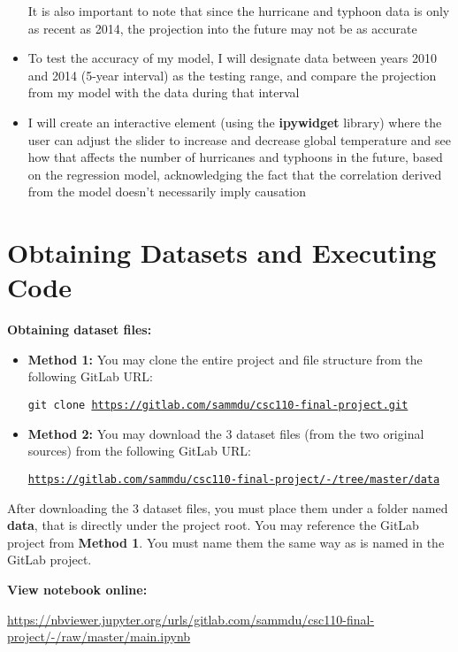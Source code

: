 \documentclass[fontsize=11pt]{article}
\begin{document}
\begin{itemize}
    It is also important to note that since the hurricane and typhoon data is only as recent as 2014, the projection into the future may not be as accurate

    \item To test the accuracy of my model, I will designate data between years 2010 and 2014 (5-year interval) as the testing range, and compare the projection from my model with the data during that interval

    \item I will create an interactive element (using the \textbf{ipywidget} library) where the user can adjust the slider to increase and decrease global temperature and see how that affects the number of hurricanes and typhoons in the future, based on the regression model, acknowledging the fact that the correlation derived from the model doesn't necessarily imply causation
\end{itemize}

\section*{Obtaining Datasets and Executing Code}

\textbf{Obtaining dataset files:}

\begin{itemize}
    \item \textbf{Method 1:} You may clone the entire project and file structure from the following GitLab URL:

    \qquad \texttt{git clone \url{https://gitlab.com/sammdu/csc110-final-project.git}}

    \item \textbf{Method 2:} You may download the 3 dataset files (from the two original sources) from the following GitLab URL:

    \qquad \texttt{\url{https://gitlab.com/sammdu/csc110-final-project/-/tree/master/data}}
\end{itemize}

After downloading the 3 dataset files, you must place them under a folder named \textbf{data}, that is directly under the project root. You may reference the GitLab project from \textbf{Method 1}. You must name them the same way as is named in the GitLab project.

\bigskip

\noindent \textbf{View notebook online:}

\medskip

\url{https://nbviewer.jupyter.org/urls/gitlab.com/sammdu/csc110-final-project/-/raw/master/main.ipynb}
\end{document}
